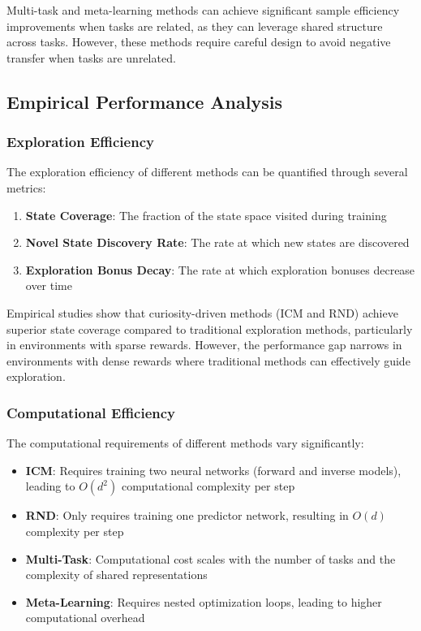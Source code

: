 \documentclass[12pt]{article}
\begin{document}
{{{Multi-task and meta-learning methods can achieve significant sample efficiency improvements when tasks are related, as they can leverage shared structure across tasks. However, these methods require careful design to avoid negative transfer when tasks are unrelated.

\subsection{Empirical Performance Analysis}

\subsubsection{Exploration Efficiency}

The exploration efficiency of different methods can be quantified through several metrics:

\begin{enumerate}
\item \textbf{State Coverage}: The fraction of the state space visited during training
\item \textbf{Novel State Discovery Rate}: The rate at which new states are discovered
\item \textbf{Exploration Bonus Decay}: The rate at which exploration bonuses decrease over time
\end{enumerate}

Empirical studies show that curiosity-driven methods (ICM and RND) achieve superior state coverage compared to traditional exploration methods, particularly in environments with sparse rewards. However, the performance gap narrows in environments with dense rewards where traditional methods can effectively guide exploration.

\subsubsection{Computational Efficiency}

The computational requirements of different methods vary significantly:

\begin{itemize}
\item \textbf{ICM}: Requires training two neural networks (forward and inverse models), leading to $O(d^2)$ computational complexity per step
\item \textbf{RND}: Only requires training one predictor network, resulting in $O(d)$ complexity per step
\item \textbf{Multi-Task}: Computational cost scales with the number of tasks and the complexity of shared representations
\item \textbf{Meta-Learning}: Requires nested optimization loops, leading to higher computational overhead
\end{itemize}

}}}
\end{document}
